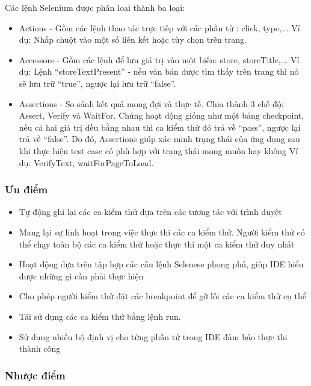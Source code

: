 \documentclass[./../main_file.tex]{subfiles}
\begin{document}
	Các lệnh Selenium được phân loại thành ba loại:
	
	\begin{itemize}
		\item Actions - Gồm các lệnh thao tác trực tiếp với các phần tử : click, type,...
		Ví dụ: Nhấp chuột vào một số liên kết hoặc tùy chọn trên trang.
		
		\item Accessors - Gồm các lệnh để lưu giá trị vào một biến: store, storeTitle,...
		Ví dụ: Lệnh “storeTextPresent” - nếu văn bản được tìm thấy trên trang thì nó sẽ lưu trữ “true”, ngược lại lưu trữ “false”.
		
		\item Assertions - So sánh kết quả mong đợi và thực tế. Chia thành 3 chế độ: Assert, Verify và WaitFor. Chúng hoạt động giống như một bảng checkpoint, nếu cả hai giá trị đều bằng nhau thì ca kiểm thử đó trả về “pass”, ngược lại trả về “false”. Do đó, Assertions giúp xác minh trạng thái của ứng dụng sau khi thực hiện test case có phù hợp với trạng thái mong muốn hay không
		Ví dụ: VerifyText, waitForPageToLoad.
	\end{itemize}

	\subsubsection{Ưu điểm}
	
	\begin{itemize}
		\item Tự động ghi lại các ca kiểm thử dựa trên các tương tác với trình duyệt
		\item Mang lại sự linh hoạt trong việc thực thi các ca kiểm thử. Người kiểm thử có thể chạy toàn bộ các ca kiểm thử hoặc thực thi một ca kiểm thử duy nhất
		\item Hoạt động dựa trên tập hợp các câu lệnh Selenese phong phú, giúp IDE hiểu được những gì cần phải thực hiện
		\item Cho phép người kiểm thử đặt các breakpoint để gỡ lỗi các ca kiểm thử cụ thể
		\item Tái sử dụng các ca kiểm thử bằng lệnh run.
		\item Sử dụng nhiều bộ định vị cho từng phần tử trong IDE đảm bảo thực thi thành công
	\end{itemize}
	
	\subsubsection{Nhược điểm}
	
\end{document}
